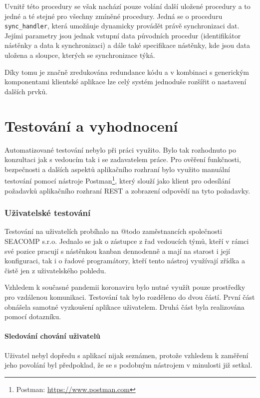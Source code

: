 Uvnitř této procedury se však nachází pouze volání další uložené procedury a to jedné a té stejné pro všechny zmíněné procedury. Jedná se o proceduru \texttt{sync\_handler}, která umožňuje dynamicky provádět právě synchronizaci dat. Jejími parametry jsou jednak vstupní data původních procedur (identifikátor nástěnky a data k synchronizaci) a dále také specifikace nástěnky, kde jsou data uložena a sloupce, kterých se synchronizace týká.

Díky tomu je značně zredukována redundance kódu a v kombinaci s generickým komponentami klientské aplikace lze celý systém jednoduše rozšířit o nastavení dalších prvků.





\chapter{Testování a vyhodnocení}
\blindtext

Automatizované testování nebylo při práci využito. Bylo tak rozhodnuto po konzultaci jak s vedoucím tak i se zadavatelem práce. Pro ověření funkčnosti, bezpečnosti a dalších aspektů aplikačního rozhraní bylo využito manuální testování pomocí nástroje Postman\footnote{Postman: \url{https://www.postman.com}}, který slouží jako klient pro odesílání požadavků aplikačního rozhraní REST a zobrazení odpovědí na tyto požadavky.

\subsection{Uživatelské testování}
Testování na uživatelích probíhalo na @todo zaměstnancích společnosti SEACOMP s.r.o. Jednalo se jak o zástupce z řad vedoucích týmů, kteří v rámci své pozice pracují s nástěnkou kanban dennodenně a mají na starost i její konfiguraci, tak i o řadové programátory, kteří tento nástroj využívají zřídka a čistě jen z uživatelského pohledu.

Vzhledem k současné pandemii koronaviru bylo nutné využít pouze prostředky pro vzdálenou komunikaci. Testování tak bylo rozděleno do dvou částí. První část obnášela samotné vyzkoušení aplikace uživatelem. Druhá část byla realizována pomocí dotazníku.

\subsubsection{Sledování chování uživatelů}
Uživatel nebyl dopředu s aplikací nijak seznámen, protože vzhledem k zaměření jeho povolání byl předpoklad, že se s podobným nástrojem v minulosti již setkal. 

